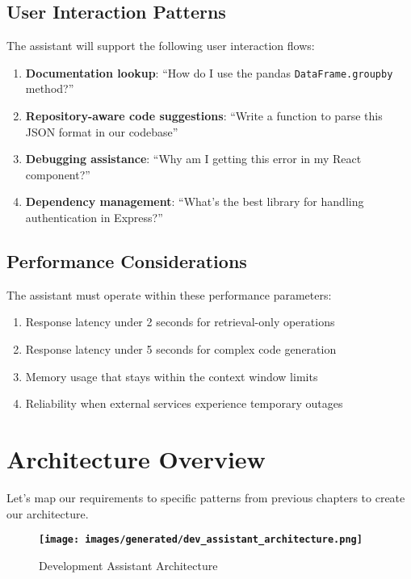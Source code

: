 \documentclass[11pt,oneside]{book}
\providecommand{\pandocbounded}[1]{\textbf{#1}}
\providecommand{\tightlist}{%
  \setlength{\itemsep}{0pt}\setlength{\parskip}{0pt}}
\begin{document}
\subsection{User Interaction Patterns}\label{user-interaction-patterns}

The assistant will support the following user interaction flows:

\begin{enumerate}
\def\labelenumi{\arabic{enumi}.}
\tightlist
\item
  \textbf{Documentation lookup}: ``How do I use the pandas
  \texttt{DataFrame.groupby} method?''
\item
  \textbf{Repository-aware code suggestions}: ``Write a function to
  parse this JSON format in our codebase''
\item
  \textbf{Debugging assistance}: ``Why am I getting this error in my
  React component?''
\item
  \textbf{Dependency management}: ``What's the best library for handling
  authentication in Express?''
\end{enumerate}

\subsection{Performance
Considerations}\label{performance-considerations-1}

The assistant must operate within these performance parameters:

\begin{enumerate}
\def\labelenumi{\arabic{enumi}.}
\tightlist
\item
  Response latency under 2 seconds for retrieval-only operations
\item
  Response latency under 5 seconds for complex code generation
\item
  Memory usage that stays within the context window limits
\item
  Reliability when external services experience temporary outages
\end{enumerate}

\section{Architecture Overview}\label{architecture-overview}

Let's map our requirements to specific patterns from previous chapters
to create our architecture.

\begin{figure}
\centering
\pandocbounded{\texttt{[image: images/generated/dev\_assistant\_architecture.png]}}
\caption{Development Assistant Architecture}
\end{figure}
\end{document}
